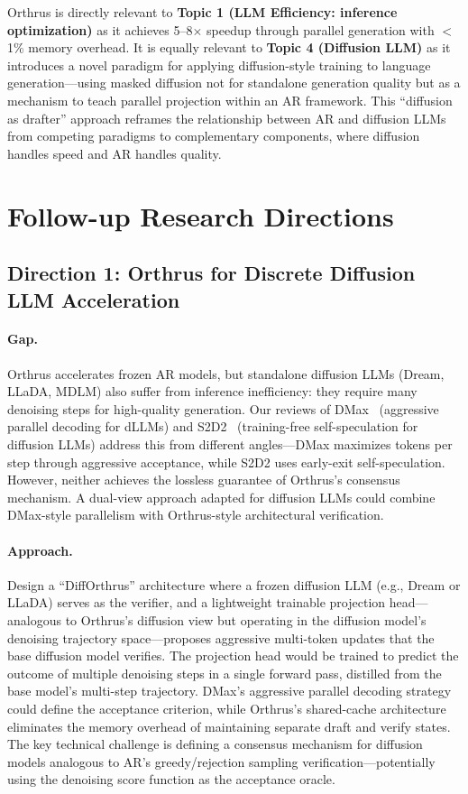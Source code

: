 \documentclass[11pt,a4paper]{article}
\begin{document}
Orthrus is directly relevant to \textbf{Topic 1 (LLM Efficiency: inference optimization)} as it achieves 5--8$\times$ speedup through parallel generation with $<$1\% memory overhead. It is equally relevant to \textbf{Topic 4 (Diffusion LLM)} as it introduces a novel paradigm for applying diffusion-style training to language generation---using masked diffusion not for standalone generation quality but as a mechanism to teach parallel projection within an AR framework. This ``diffusion as drafter'' approach reframes the relationship between AR and diffusion LLMs from competing paradigms to complementary components, where diffusion handles speed and AR handles quality.

\section{Follow-up Research Directions}

\subsection{Direction 1: Orthrus for Discrete Diffusion LLM Acceleration}

\paragraph{Gap.} Orthrus accelerates frozen AR models, but standalone diffusion LLMs (Dream, LLaDA, MDLM) also suffer from inference inefficiency: they require many denoising steps for high-quality generation. Our reviews of DMax~\cite{dmax} (aggressive parallel decoding for dLLMs) and S2D2~\cite{s2d2} (training-free self-speculation for diffusion LLMs) address this from different angles---DMax maximizes tokens per step through aggressive acceptance, while S2D2 uses early-exit self-speculation. However, neither achieves the lossless guarantee of Orthrus's consensus mechanism. A dual-view approach adapted for diffusion LLMs could combine DMax-style parallelism with Orthrus-style architectural verification.

\paragraph{Approach.} Design a ``DiffOrthrus'' architecture where a frozen diffusion LLM (e.g., Dream or LLaDA) serves as the verifier, and a lightweight trainable projection head---analogous to Orthrus's diffusion view but operating in the diffusion model's denoising trajectory space---proposes aggressive multi-token updates that the base diffusion model verifies. The projection head would be trained to predict the outcome of multiple denoising steps in a single forward pass, distilled from the base model's multi-step trajectory. DMax's aggressive parallel decoding strategy could define the acceptance criterion, while Orthrus's shared-cache architecture eliminates the memory overhead of maintaining separate draft and verify states. The key technical challenge is defining a consensus mechanism for diffusion models analogous to AR's greedy/rejection sampling verification---potentially using the denoising score function as the acceptance oracle.
\end{document}
